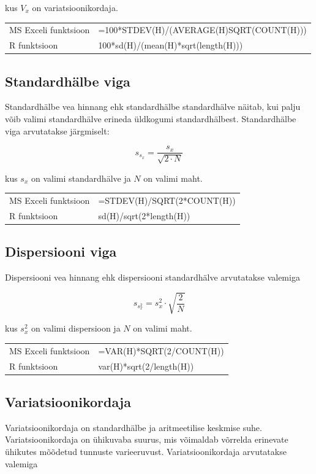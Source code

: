 \documentclass[
]{book}
\theoremstyle{definition}
\theoremstyle{definition}
\theoremstyle{definition}
\theoremstyle{definition}
\theoremstyle{remark}
\begin{document}
kus \(V_x\) on variatsioonikordaja.

\begin{tabular}{ll}
MS Exceli funktsioon & =100*STDEV(H)/(AVERAGE(H)\*SQRT(COUNT(H))) \\
R funktsioon & 100*sd(H)/(mean(H)*sqrt(length(H))) \\
\end{tabular}

\subsection{Standardhälbe viga}\label{standardhuxe4lbe-viga}

Standardhälbe vea hinnang ehk standardhälbe standardhälve näitab, kui palju võib valimi standardhälve erineda üldkogumi standardhälbest. Standardhälbe viga arvutatakse järgmiselt:

\[s_{s_x} = \frac{s_x}{\sqrt{2 \cdot N}}\]

kus \(s_x\) on valimi standardhälve ja \(N\) on valimi maht.

\begin{tabular}{ll}
MS Exceli funktsioon & =STDEV(H)/SQRT(2*COUNT(H)) \\
R funktsioon & sd(H)/sqrt(2*length(H)) \\
\end{tabular}

\subsection{Dispersiooni viga}\label{dispersiooni-viga}

Dispersiooni vea hinnang ehk dispersiooni standardhälve arvutatakse valemiga

\[s_{s_x^2} = s_x^2 \cdot \sqrt{\frac{2}{N}}\]

kus \(s_x^2\) on valimi dispersioon ja \(N\) on valimi maht.

\begin{tabular}{ll}
MS Exceli funktsioon & =VAR(H)*SQRT(2/COUNT(H)) \\
R funktsioon & var(H)*sqrt(2/length(H))
\end{tabular}

\subsection{Variatsioonikordaja}\label{variatsioonikordaja}

Variatsioonikordaja on standardhälbe ja aritmeetilise keskmise suhe. Variatsioonikordaja on ühikuvaba suurus, mis võimaldab võrrelda erinevate ühikutes mõõdetud tunnuste varieeruvust. Variatsioonikordaja arvutatakse valemiga
\end{document}
